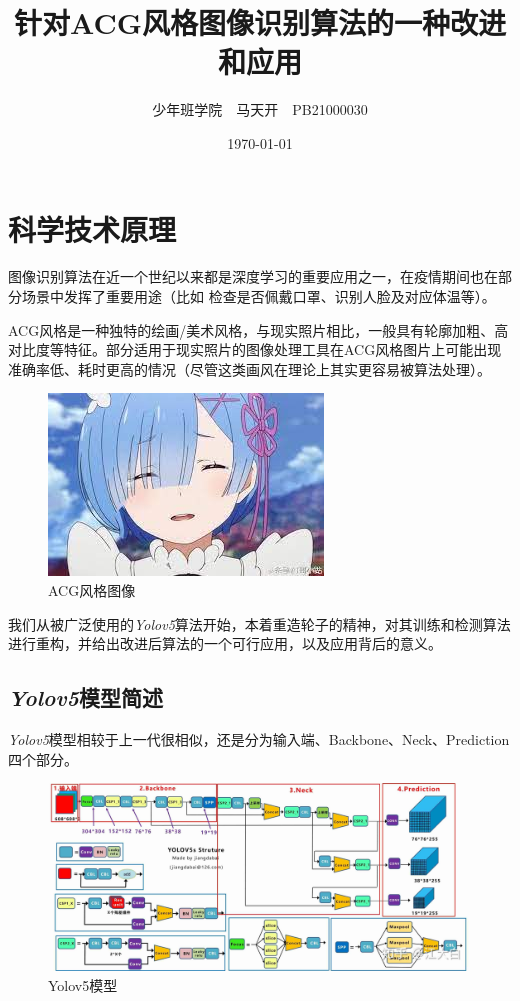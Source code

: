 \documentclass[a4paper]{ltxdoc}
\title{针对ACG风格图像识别算法的一种改进和应用}
\author{少年班学院\ \ 马天开\ \ PB21000030}
\date{\today}
\begin{document}
\maketitle
\section{科学技术原理}
图像识别算法在近一个世纪以来都是深度学习的重要应用之一，在疫情期间也在部分场景中发挥了重要用途（比如 检查是否佩戴口罩、识别人脸及对应体温等）。

ACG风格是一种独特的绘画/美术风格，与现实照片相比，一般具有轮廓加粗、高对比度等特征。部分适用于现实照片的图像处理工具在ACG风格图片上可能出现准确率低、耗时更高的情况（尽管这类画风在理论上其实更容易被算法处理）。

\begin{figure}[h]
    \centering
    \includegraphics[scale = 0.5]{img/ACG.jpg}
    \caption{ACG风格图像}
\end{figure}

我们从被广泛使用的\textit{Yolov5}算法开始，本着重造轮子的精神，对其训练和检测算法进行重构，并给出改进后算法的一个可行应用，以及应用背后的意义。

\subsection{\textit{Yolov5}模型简述}

\textit{Yolov5}模型相较于上一代很相似，还是分为输入端、Backbone、Neck、Prediction四个部分。
\begin{figure}[h]
    \centering
    \includegraphics[scale = 0.1]{img/yolov5.jpg}
    \caption{Yolov5模型}
\end{figure}
\end{document}

